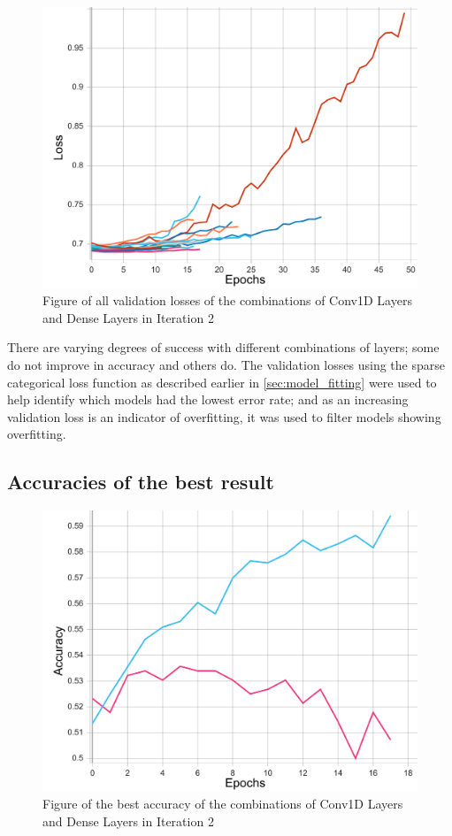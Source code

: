 \begin{figure}[ht]
    \centering
    \includegraphics[width=0.95\columnwidth]{figures/results/cnn/cnn_all_loss.pdf}
    \caption[Validation losses for Iteration 2]{Figure of all validation losses of the combinations of Conv1D Layers and Dense Layers in Iteration 2}
    \label{fig:iteration2_all_loss}
\end{figure}
\FloatBarrier

There are varying degrees of success with different combinations of layers; some do not improve in accuracy and others do.
The validation losses using the sparse categorical loss function as described earlier in \autoref{sec:model_fitting}
were used to help identify which models had the lowest error rate; and as an increasing validation
loss is an indicator of overfitting, it was used to filter models showing overfitting.

\subsection{Accuracies of the best result}
\begin{figure}[ht]
    \centering
    \includegraphics[width=0.95\columnwidth]{figures/results/cnn/cnn_1C32-1D64_acc.pdf}
    \caption[Best accuracy for Iteration 2]{Figure of the best accuracy of the combinations of Conv1D Layers and Dense Layers in Iteration 2}
    \label{fig:iteration2_best_accuracy}
\end{figure}
\FloatBarrier

